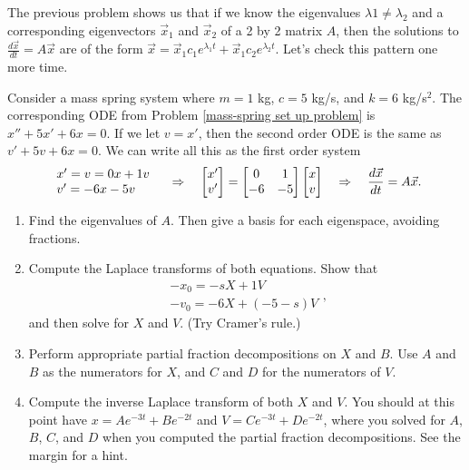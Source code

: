 The previous problem shows us that if we know the eigenvalues $\lambda 1\neq \lambda_2$ and a corresponding eigenvectors $\vec x_1$ and $\vec x_2$ of a 2 by 2 matrix $A$, then the solutions to $\frac{d\vec x}{dt}=A\vec x$ are of the form $\vec x = \vec x_1 c_1 e^{\lambda_1 t}+\vec x_1 c_2 e^{\lambda_2 t}$.  Let's check this pattern one more time.















\begin{problem}\label{mass-spring system of first order ODEs solution introduction}
 Consider a mass spring system where $m=1$ kg, $c=5$ kg/s, and  $k=6$ kg/s$^2$.  The corresponding ODE from Problem \ref{mass-spring set up problem} is $x''+5x'+6x=0$. If we let $v=x'$, then the second order ODE is the same as $v'+5v+6x=0$. We can write all this as the first order system
$$
\begin{array}{l}
x'=v=0x+1v\\
v'=-6x-5v 
\end{array}
\quad\Rightarrow\quad
\begin{bmatrix} x'\\v' \end{bmatrix} =\begin{bmatrix} 0&1\\-6&-5 \end{bmatrix}\begin{bmatrix} x\\v \end{bmatrix} 
\quad\Rightarrow\quad
\dfrac{d\vec{x}}{dt} =A\vec x. 
$$
\begin{enumerate}
 \item Find the eigenvalues of $A$.  Then give a basis for each eigenspace, avoiding fractions.
 \item Compute the Laplace transforms of both equations.  
%
Show that
$$
\begin{array}{l}
 -x_0 = -sX+1V\\
 -v_0 = -6X+(-5-s)V
\end{array},
$$
and then solve for $X$ and $V$. (Try Cramer's rule.)
\item 
Perform appropriate partial fraction decompositions on $X$ and $B$. Use $A$ and $B$ as the numerators for $X$, and $C$ and $D$ for the numerators of $V$. 
\item 
{}%
Compute the inverse Laplace transform of both $X$ and $V$. You should at this point have $x=Ae^{-3t}+Be^{-2 t}$ and $V=Ce^{-3t}+De^{-2t}$, where you solved for $A$, $B$, $C$, and $D$ when you computed the partial fraction decompositions.  See the margin for a hint.
\end{enumerate}

\end{problem}
